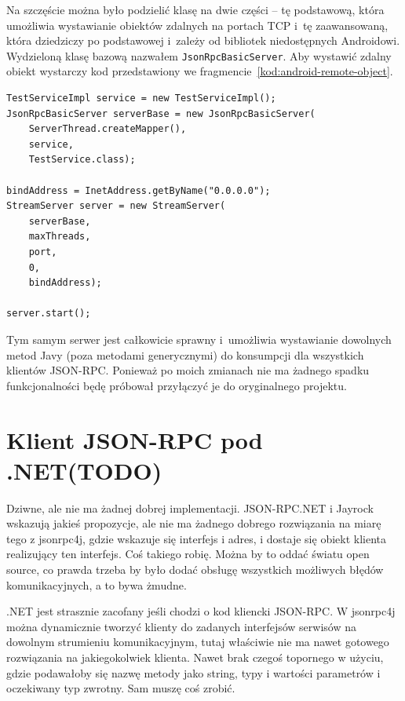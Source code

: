 Na szczęście można było podzielić klasę na dwie części -- tę podstawową, która umożliwia wystawianie obiektów zdalnych na portach TCP i~tę zaawansowaną, która dziedziczy po podstawowej i~zależy od bibliotek niedostępnych Androidowi.
Wydzieloną klasę bazową nazwałem \texttt{JsonRpcBasicServer}. Aby wystawić zdalny obiekt wystarczy kod przedstawiony we fragmencie~\ref{kod:android-remote-object}.

\begin{lstlisting}[float, frame=single, caption={Tworzenie obiektu zdalnego przy pomocy jsonrpc4j dostosowanego do Androida.}, label=kod:android-remote-object]
TestServiceImpl service = new TestServiceImpl();
JsonRpcBasicServer serverBase = new JsonRpcBasicServer(
    ServerThread.createMapper(),
    service,
    TestService.class);
		
bindAddress = InetAddress.getByName("0.0.0.0");
StreamServer server = new StreamServer(
    serverBase,
    maxThreads,
    port,
    0,
    bindAddress);

server.start();
\end{lstlisting}

Tym samym serwer jest całkowicie sprawny i~umożliwia wystawianie dowolnych metod Javy (poza metodami generycznymi) do konsumpcji dla wszystkich klientów JSON-RPC.
Ponieważ po moich zmianach nie ma żadnego spadku funkcjonalności będę próbował przyłączyć je do oryginalnego projektu.



\section{Klient JSON-RPC pod .NET(TODO)}
Dziwne, ale nie ma żadnej dobrej implementacji. JSON-RPC.NET i Jayrock wskazują jakieś propozycje, ale nie ma żadnego dobrego rozwiązania na miarę tego z jsonrpc4j, gdzie wskazuje się interfejs i adres, i dostaje się obiekt klienta realizujący ten interfejs.
Coś takiego robię. Można by to oddać światu open source, co prawda trzeba by było dodać obsługę wszystkich możliwych błędów komunikacyjnych, a to bywa żmudne.

.NET jest strasznie zacofany jeśli chodzi o kod kliencki JSON-RPC. W jsonrpc4j można dynamicznie tworzyć klienty do zadanych interfejsów serwisów na dowolnym strumieniu komunikacyjnym, tutaj właściwie nie ma nawet gotowego rozwiązania na jakiegokolwiek klienta. Nawet brak czegoś topornego w użyciu, gdzie podawałoby się nazwę metody jako string, typy i wartości parametrów i oczekiwany typ zwrotny.
Sam muszę coś zrobić.

